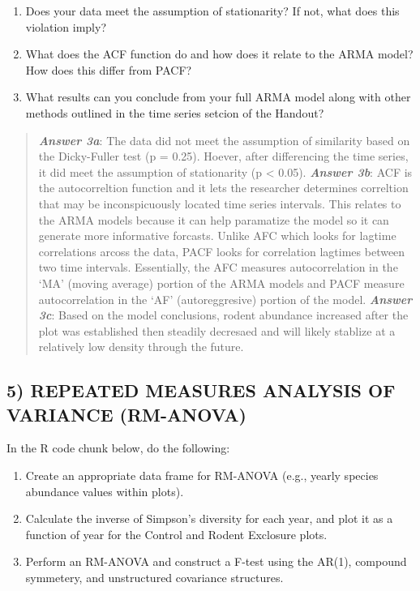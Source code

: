 \documentclass[]{article}
\providecommand{\tightlist}{%
  \setlength{\itemsep}{0pt}\setlength{\parskip}{0pt}}
\begin{document}
\begin{enumerate}
\def\labelenumi{\alph{enumi}.}
\tightlist
\item
  Does your data meet the assumption of stationarity? If not, what does
  this violation imply?
\item
  What does the ACF function do and how does it relate to the ARMA
  model? How does this differ from PACF?
\item
  What results can you conclude from your full ARMA model along with
  other methods outlined in the time series setcion of the Handout?
\end{enumerate}

\begin{quote}
\textbf{\emph{Answer 3a}}: The data did not meet the assumption of
similarity based on the Dicky-Fuller test (p = 0.25). Hoever, after
differencing the time series, it did meet the assumption of stationarity
(p \textless{} 0.05). \textbf{\emph{Answer 3b}}: ACF is the
autocorreltion function and it lets the researcher determines correltion
that may be inconspicuously located time series intervals. This relates
to the ARMA models because it can help paramatize the model so it can
generate more informative forcasts. Unlike AFC which looks for lagtime
correlations arcoss the data, PACF looks for correlation lagtimes
between two time intervals. Essentially, the AFC measures
autocorrelation in the `MA' (moving average) portion of the ARMA models
and PACF measure autocorrelation in the `AF' (autoreggresive) portion of
the model. \textbf{\emph{Answer 3c}}: Based on the model conclusions,
rodent abundance increased after the plot was established then steadily
decresaed and will likely stablize at a relatively low density through
the future.
\end{quote}

\subsection{5) REPEATED MEASURES ANALYSIS OF VARIANCE
(RM-ANOVA)}\label{repeated-measures-analysis-of-variance-rm-anova}

In the R code chunk below, do the following:

\begin{enumerate}
\def\labelenumi{\arabic{enumi}.}
\tightlist
\item
  Create an appropriate data frame for RM-ANOVA (e.g., yearly species
  abundance values within plots).
\item
  Calculate the inverse of Simpson's diversity for each year, and plot
  it as a function of year for the Control and Rodent Exclosure plots.
\item
  Perform an RM-ANOVA and construct a F-test using the AR(1), compound
  symmetery, and unstructured covariance structures.
\end{enumerate}
\end{document}

